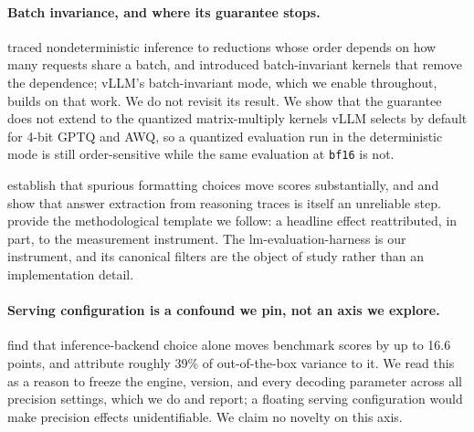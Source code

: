 \documentclass[11pt]{article}
\begin{document}
\paragraph{Batch invariance, and where its guarantee stops.}
\citet{he2025nondeterminism} traced nondeterministic inference to reductions whose order
depends on how many requests share a batch, and introduced batch-invariant kernels that
remove the dependence; vLLM's batch-invariant mode, which we enable throughout, builds on
that work. We do not revisit its result. We show that the guarantee does not extend to the
quantized matrix-multiply kernels vLLM selects by default for 4-bit GPTQ and AWQ, so a
quantized evaluation run in the deterministic mode is still order-sensitive while the
same evaluation at \texttt{bf16} is not.

\citet{sclar2024formatspread} establish that spurious formatting choices move
scores substantially, and \citet{jo2025finding} and \citet{yu2025xfinder} show
that answer extraction from reasoning traces is itself an unreliable step.
\citet{schaeffer2023mirage} provide the methodological template we follow: a
headline effect reattributed, in part, to the measurement instrument.
The lm-evaluation-harness \citep{biderman2024lessons} is our instrument, and its
canonical filters are the object of study rather than an implementation detail.

\paragraph{Serving configuration is a confound we pin, not an axis we explore.}
\citet{pape2026silent} find that inference-backend choice alone moves benchmark
scores by up to 16.6 points, and \citet{masoudian2026sideeffect} attribute
roughly 39\% of out-of-the-box variance to it. We read this as a reason to
freeze the engine, version, and every decoding parameter across all precision
settings, which
we do and report; a floating serving configuration would make precision effects
unidentifiable. We claim no novelty on this axis.
\end{document}
